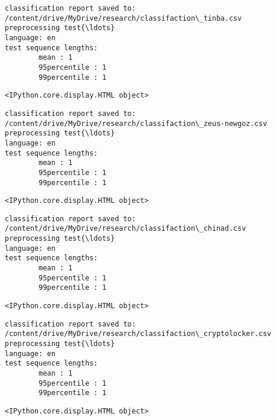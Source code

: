 \documentclass[11pt]{article}
\begin{document}
    
    \begin{Verbatim}[commandchars=\\\{\}]
classification report saved to:
/content/drive/MyDrive/research/classifaction\_tinba.csv
preprocessing test{\ldots}
language: en
test sequence lengths:
        mean : 1
        95percentile : 1
        99percentile : 1
    \end{Verbatim}

    
    \begin{Verbatim}[commandchars=\\\{\}]
<IPython.core.display.HTML object>
    \end{Verbatim}

    
    \begin{Verbatim}[commandchars=\\\{\}]
classification report saved to:
/content/drive/MyDrive/research/classifaction\_zeus-newgoz.csv
preprocessing test{\ldots}
language: en
test sequence lengths:
        mean : 1
        95percentile : 1
        99percentile : 1
    \end{Verbatim}

    
    \begin{Verbatim}[commandchars=\\\{\}]
<IPython.core.display.HTML object>
    \end{Verbatim}

    
    \begin{Verbatim}[commandchars=\\\{\}]
classification report saved to:
/content/drive/MyDrive/research/classifaction\_chinad.csv
preprocessing test{\ldots}
language: en
test sequence lengths:
        mean : 1
        95percentile : 1
        99percentile : 1
    \end{Verbatim}

    
    \begin{Verbatim}[commandchars=\\\{\}]
<IPython.core.display.HTML object>
    \end{Verbatim}

    
    \begin{Verbatim}[commandchars=\\\{\}]
classification report saved to:
/content/drive/MyDrive/research/classifaction\_cryptolocker.csv
preprocessing test{\ldots}
language: en
test sequence lengths:
        mean : 1
        95percentile : 1
        99percentile : 1
    \end{Verbatim}

    
    \begin{Verbatim}[commandchars=\\\{\}]
<IPython.core.display.HTML object>
    \end{Verbatim}
\end{document}
